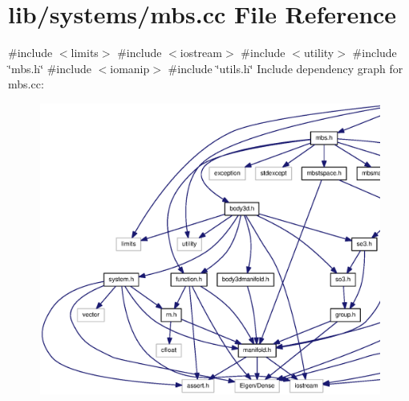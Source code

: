 \section{lib/systems/mbs.cc \-File \-Reference}
\label{mbs_8cc}
{\ttfamily \#include $<$limits$>$}\*
{\ttfamily \#include $<$iostream$>$}\*
{\ttfamily \#include $<$utility$>$}\*
{\ttfamily \#include \char`\"{}mbs.\-h\char`\"{}}\*
{\ttfamily \#include $<$iomanip$>$}\*
{\ttfamily \#include \char`\"{}utils.\-h\char`\"{}}\*
\-Include dependency graph for mbs.\-cc\-:\nopagebreak
\begin{figure}[H]
\begin{center}
\leavevmode
\includegraphics[width=350pt]{mbs_8cc__incl}
\end{center}
\end{figure}
